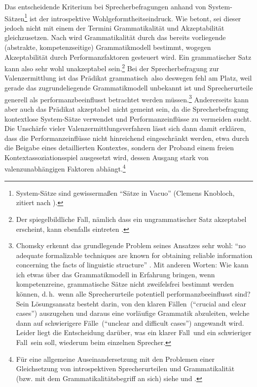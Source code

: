 Das entscheidende Kriterium bei Sprecherbefragungen anhand von System-Sät\-zen\footnote{System-Sätze sind gewisserma\ss en "`Sätze in Vacuo"' (Clemens Knobloch, zitiert nach \citealt[12]{Ortner:87}).} ist der introspektive Wohlgeformtheitseindruck. Wie \cite{Storrer:92} betont, sei dieser jedoch nicht mit einem der Termini Grammatikalität und Akzeptabilität gleichzusetzen. Nach \cite{Chomsky:65} wird Grammatikalität durch das bereits vorliegende (abstrakte, kompetenzseitige) Grammatikmodell bestimmt, wogegen Akzeptabilität durch Performanzfaktoren gesteuert wird. Ein grammatischer Satz kann also sehr wohl unakzeptabel sein.\footnote{Der spiegelbildliche Fall, nämlich dass ein ungrammatischer Satz akzeptabel erscheint, kann ebenfalls eintreten \citep{Frazier:85,Gibson:Thomas:99}.} Bei der Sprecherbefragung zur Valenzermittlung ist das Prädikat \glq grammatisch\grq\ also deswegen fehl am Platz, weil gerade das zugrundeliegende Grammatikmodell unbekannt ist und Sprecherurteile generell als performanzbeeinflusst betrachtet werden müssen.\footnote{Chomsky erkennt das grundlegende Problem seines Ansatzes sehr wohl: "`no adequate formalizable techniques are known for obtaining reliable information concerning the facts of linguistic structure"' \cite[19]{Chomsky:65}. Mit anderen Worten: Wie kann ich etwas über das Grammatikmodell in Erfahrung bringen, wenn kompetenzreine, grammatische Sätze nicht zweifelsfrei bestimmt werden können, d.\,h.\ wenn alle Sprecherurteile potentiell performanzbeeinflusst sind? Sein Lösungsansatz besteht darin, von den \glq klaren Fällen\grq\ ("`crucial and clear cases"') auszugehen und daraus eine vorläufige Grammatik abzuleiten, welche dann auf \glq schwierigere Fälle\grq\ ("`unclear and difficult cases"') angewandt wird. Leider liegt die Entscheidung darüber, was ein \glq klarer Fall\grq\ und ein \glq schwieriger Fall\grq\ sein soll, wiederum beim einzelnen Sprecher.} Andererseits kann aber auch das Prädikat \glq akzeptabel\grq\ nicht gemeint sein, da die Sprecherbefragung kontextlose System-Sät\-ze verwendet und Performanzeinflüsse zu vermeiden sucht. Die Unschärfe vieler Valenzermittlungsverfahren lässt sich dann damit erklären, dass die Performanzeinflüsse nicht hinreichend eingeschränkt werden, etwa durch die Beigabe eines detaillierten Kontextes, sondern der Proband einem freien Kontextassoziationsspiel ausgesetzt wird, dessen Ausgang stark von valenzunabhängigen Faktoren abhängt.\footnote{Für eine allgemeine Auseinandersetzung mit den Problemen einer Gleichsetzung von introspektiven Sprecherurteilen und Grammatikalität (bzw. mit dem Grammatikalitätsbegriff an sich) siehe \cite{Schuetze:96} und \cite{Sampson:07}.}

